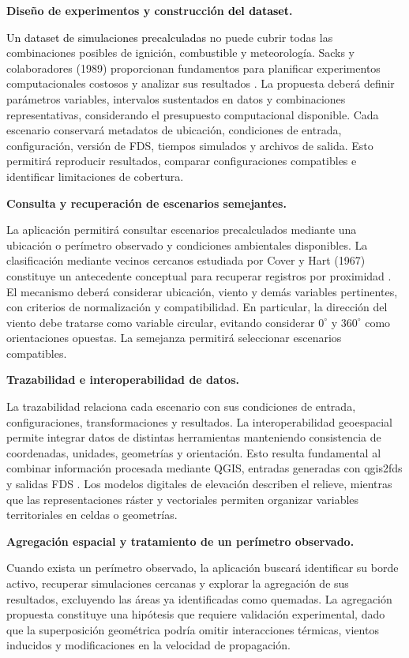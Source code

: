 \textbf{Diseño de experimentos y construcción \textcolor{black}{del dataset}.}

\textcolor{black}{Un dataset de simulaciones precalculadas} no puede cubrir todas las combinaciones posibles de ignición, combustible y meteorología. Sacks y colaboradores (1989) proporcionan fundamentos para planificar experimentos computacionales costosos y analizar sus resultados \cite{vfpSacks1989}. La propuesta deberá definir parámetros variables, intervalos sustentados en datos y combinaciones representativas, considerando el presupuesto computacional disponible. Cada escenario conservará metadatos de ubicación, condiciones de entrada, configuración, versión de FDS, tiempos simulados y archivos de salida. Esto permitirá reproducir resultados, comparar configuraciones compatibles e identificar limitaciones de cobertura.

\textbf{Consulta y recuperación de escenarios semejantes.}

La aplicación permitirá consultar escenarios precalculados mediante una ubicación o perímetro observado y condiciones ambientales disponibles. La clasificación mediante vecinos cercanos estudiada por Cover y Hart (1967) constituye un antecedente conceptual para recuperar registros por proximidad \cite{cover1967}. El mecanismo deberá considerar ubicación, viento y demás variables pertinentes, con criterios de normalización y compatibilidad. En particular, la dirección del viento debe tratarse como variable circular, evitando considerar $0^\circ$ y $360^\circ$ como orientaciones opuestas. La semejanza permitirá seleccionar escenarios compatibles.

\textbf{Trazabilidad e interoperabilidad de datos.}

La trazabilidad relaciona cada escenario con sus condiciones de entrada, configuraciones, transformaciones y resultados. La interoperabilidad geoespacial permite integrar datos de distintas herramientas manteniendo consistencia de coordenadas, unidades, geometrías y orientación. Esto resulta fundamental al combinar información procesada mediante QGIS, entradas generadas con qgis2fds y salidas FDS \cite{vfpQGIS,vfpQGIS2FDS}. Los modelos digitales de elevación describen el relieve, mientras que las representaciones ráster y vectoriales permiten organizar variables territoriales en celdas o geometrías.

\textbf{Agregación espacial y tratamiento de un perímetro observado.}

Cuando exista un perímetro observado, la aplicación buscará identificar su borde activo, recuperar simulaciones cercanas y explorar la agregación de sus resultados, excluyendo las áreas ya identificadas como quemadas. La agregación propuesta constituye una hipótesis que requiere validación experimental, dado que la superposición geométrica podría omitir interacciones térmicas, vientos inducidos y modificaciones en la velocidad de propagación.

